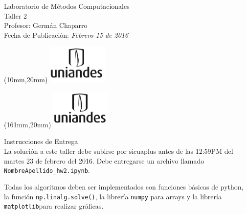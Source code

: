 \documentclass[11pt,letterpaper]{exam}
\begin{document}
\begin{center}
{\Large Laboratorio de Métodos Computacionales} \\
Taller 2 \\
Profesor: Germ\'an Chaparro\\
Fecha de Publicación: {\small \it Febrero 15 de 2016}\\
\end{center}

\begin{textblock*}{40mm}(10mm,20mm)
  \includegraphics[width=3cm]{logoUniandes.png}
\end{textblock*}

\begin{textblock*}{40mm}(161mm,20mm)
  \includegraphics[width=3cm]{logoUniandes.png}
\end{textblock*}

\vspace{0.5cm}

{\Large Instrucciones de Entrega}\\

\noindent
La solución a este taller debe subirse por sicuaplus antes de las 12:59PM
del martes 23 de febrero del 2016. 
\noindent
Debe entregarse un archivo llamado \verb"NombreApellido_hw2.ipynb".

\par

Todas los algoritmos deben ser implementados con funciones b\'asicas
de python, la función \verb"np.linalg.solve()", la librería \verb"numpy"
para arrays y la librería \verb"matplotlib"para realizar gráficas.
\end{document}
